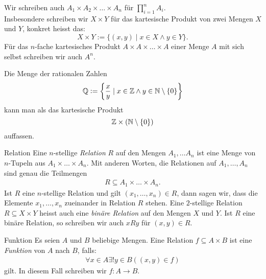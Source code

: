 \begin{remark}
    Wir schreiben auch $A_1\times A_2\times \dots\times A_n$ für $\prod_{i=1}^nA_i$.\\ Insbesondere schreiben wir $X\times Y$ für das kartesische Produkt von zwei Mengen $X$ und $Y$, konkret heisst das:
    \[
        X\times Y:=\{(x,y)\mid x\in X\land y\in Y \}.
    \]
    Für das $n$-fache kartesisches Produkt $A\times A\times\dots\times A$ einer Menge $A$ mit sich selbst schreiben wir auch $A^n$.
\end{remark}

\begin{example}
    Die Menge der rationalen Zahlen
    \[
        \mathbb{Q}:=\left\{\frac{x}{y}\mid x\in \mathbb{Z}\land y\in\mathbb{N}\setminus\{0\}\right\}
    \]
    kann man als das kartesische Produkt
    \[
        \mathbb{Z}\times(\mathbb{N}\setminus\{0\})
    \]
    auffassen.
\end{example}

\begin{definition}{Relation}
    Eine $n$-stellige \textit{Relation} $R$ auf den Mengen $A_1,\dots A_n$ ist eine Menge von $n$-Tupeln aus $A_1\times\dots \times A_n$. Mit anderen Worten, die Relationen auf $A_1,\dots,A_n$ sind genau die Teilmengen
    \begin{align*}
        R\subseteq A_1\times\dots \times A_n.
    \end{align*}
    Ist $R$ eine $n$-stellige Relation und gilt $(x_1,\dots,x_n)\in R$, dann sagen wir, dass die Elemente $x_1,\dots,x_n$ zueinander in Relation $R$ stehen.
    \tcblower
    Eine $2$-stellige Relation $R\subseteq X\times Y$ heisst auch eine \textit{binäre Relation} auf den Mengen $X$ und $Y$. Ist $R$ eine binäre Relation, so schreiben wir auch $xRy$ für $(x,y)\in R$.
\end{definition}

\begin{definition}{Funktion}
    Es seien $A$ und $B$ beliebige Mengen. Eine Relation $f\subseteq A\times B$ ist eine \textit{Funktion} von $A$ nach $B$, falls:
    \begin{align*}
        \forall x\in A\exists!y\in B((x,y)\in f)
    \end{align*}
    gilt. In diesem Fall schreiben wir $f:A\to B.$
\end{definition}

